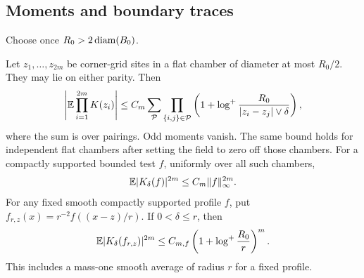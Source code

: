 \subsection{Moments and boundary traces}

Choose once \(R_0>2\operatorname{diam}(B_0)\).

\begin{proposition}
\label{prop:log-moments}
Let $z_1,\ldots,z_{2m}$ be corner-grid sites in a flat chamber of
diameter at most $R_0/2$. They may lie on either parity. Then
\begin{equation}
 \left|\mathbb E\prod_{i=1}^{2m}K(z_i)\right|
 \le C_m\sum_{\mathcal P}\prod_{\{i,j\}\in\mathcal P}
 \left(1+\log^+\frac{R_0}{|z_i-z_j|\vee\delta}\right),
 \label{eq:flat-log-moments}
\end{equation}
where the sum is over pairings. Odd moments vanish. The same bound holds for
independent flat chambers after setting the field to zero off those chambers.
For a compactly supported bounded test $f$, uniformly over all such chambers,
\begin{equation}
 \mathbb E|K_\delta(f)|^{2m}\le C_m\|f\|_\infty^{2m}.
 \label{eq:flat-smearing-moments}
\end{equation}
For any fixed smooth compactly supported profile $f$, put
$f_{r,z}(x)=r^{-2}f((x-z)/r)$. If $0<\delta\le r$, then
\begin{equation}
 \mathbb E|K_\delta(f_{r,z})|^{2m}
       \le C_{m,f}\left(1+\log^+\frac{R_0}{r}\right)^m.
 \label{eq:flat-scaled-moments}
\end{equation}
This includes a mass-one smooth average of radius $r$ for a fixed profile.
\end{proposition}

